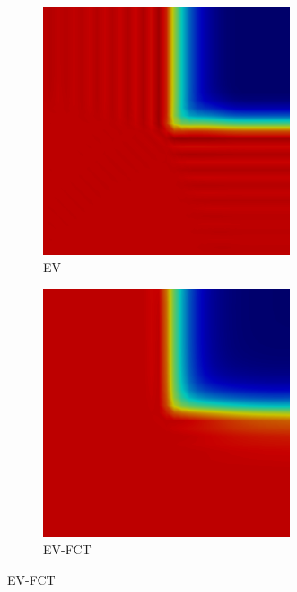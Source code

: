 \begin{frame}
\begin{figure}[h]
\begin{subfigure}{0.3\textwidth}
      \centering
      \includegraphics[width=0.8\textwidth]{./figures/skew_EV.png}
      \caption{EV}
   \end{subfigure}
   \begin{subfigure}{0.3\textwidth}
      \centering
      \includegraphics[width=0.8\textwidth]{./figures/skew_EVFCT.png}
      \caption{EV-FCT}
   \end{subfigure}
\end{figure}

\end{frame}
